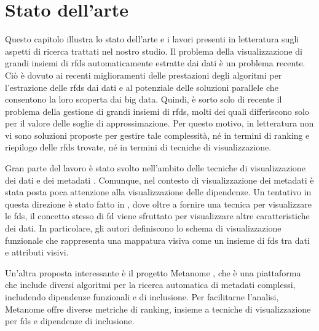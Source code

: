 \chapter{Stato dell'arte}%
\label{cap2:stato_arte}
%

Questo capitolo illustra lo stato dell'arte e i lavori presenti in letteratura sugli aspetti di ricerca trattati nel nostro studio. Il problema della visualizzazione di grandi insiemi di \acrshort{rfds} automaticamente estratte dai dati \`{e} un problema recente. Ci\`{o} \`{e} dovuto ai recenti miglioramenti delle prestazioni degli algoritmi per l'estrazione delle \acrshort{rfds} dai dati e al potenziale delle soluzioni parallele che consentono la loro scoperta dai big data. Quindi, \`{e} sorto solo di recente il problema della gestione di grandi insiemi di \acrshort{rfds}, molti dei quali differiscono solo per il valore delle soglie di approssimazione. Per questo motivo, in letteratura non vi sono soluzioni proposte per gestire tale complessit\`{a}, n\'{e} in termini di ranking e riepilogo delle \acrshort{rfds} trovate, n\'{e} in termini di tecniche di visualizzazione.\par
Gran parte del lavoro \`{e} stato svolto nell'ambito delle tecniche di visualizzazione dei dati e dei metadati \cite{topicmodeling}. Comunque, nel contesto di visualizzazione dei metadati \`{e} stata posta poca attenzione alla visualizzazione delle dipendenze. Un tentativo in questa direzione \`{e} stato fatto in \cite{frameworktoanalyzeinfo}, dove oltre a fornire una tecnica per visualizzare le \acrshort{fds}, il concetto stesso di \acrshort{fd} viene sfruttato per visualizzare altre caratteristiche dei dati. In particolare, gli autori definiscono lo schema di visualizzazione funzionale che rappresenta una mappatura visiva come un insieme di \acrshort{fds} tra dati e attributi visivi.\par
Un'altra proposta interessante \`{e} il progetto Metanome \cite{dataprofilingwithmetanome}, che \`{e} una piattaforma che include diversi algoritmi per la ricerca automatica di metadati complessi, includendo dipendenze funzionali e di inclusione. Per facilitarne l'analisi, Metanome offre diverse metriche di ranking, insieme a tecniche di visualizzazione per \acrshort{fds} e dipendenze di inclusione.\par
